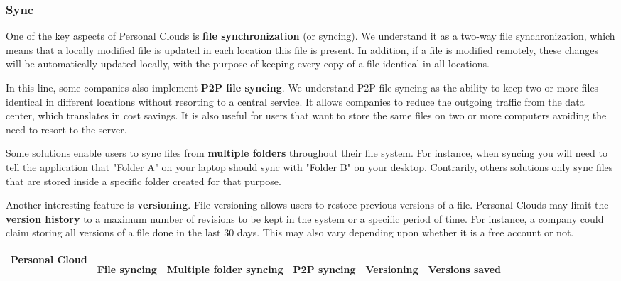 {\subsubsection{Sync}
One of the key aspects of Personal Clouds is \textbf{file synchronization} (or syncing). We understand it as a two-way file synchronization, which means that a locally modified file is updated in each location this file is present. In addition, if a file is modified remotely, these changes will be automatically updated locally, with the purpose of keeping every copy of a file identical in all locations.

In this line, some companies also implement \textbf{P2P file syncing}. We understand P2P file syncing as the ability to keep two or more files identical in different locations without resorting to a central service. It allows companies to reduce the outgoing traffic from the data center, which translates in cost savings. It is also useful for users that want to store the same files on two or more computers avoiding the need to resort to the server.

Some solutions enable users to sync files from \textbf{multiple folders} throughout their file system. For instance, when syncing you will need to tell the application that "Folder A" on your laptop should sync with "Folder B" on your desktop. Contrarily, others solutions only sync files that are stored inside a specific folder created for that purpose.

Another interesting feature is \textbf{versioning}. File versioning allows users to restore previous versions of a file. Personal Clouds may limit the \textbf{version history} to a maximum number of revisions to be kept in the system or a specific period of time. For instance, a company could claim storing all versions of a file done in the last 30 days. This may also vary depending upon whether it is a free account or not.


{
\def\arraystretch{1.5}

\begin{table}
\begin{center}
    \begin{tabular}{ | p{3.3cm} | p{1.4cm} | p{1.4cm} | p{2.4cm} | p{1.4cm} | p{2.9cm} | }
    \hline
    \rowcolor[gray]{0.8}

	\textbf{Personal Cloud} &
	\begin{sideways}\textbf{File syncing}\end{sideways} &
	\begin{sideways}\textbf{Multiple folder syncing}\end{sideways} &
	\begin{sideways}\textbf{P2P syncing}\end{sideways} & 
	\begin{sideways}\textbf{Versioning}\end{sideways} & 
	\begin{sideways}\textbf{Versions saved}\end{sideways} \\ \hline


\end{tabular}
\end{center}
\end{table}}}
